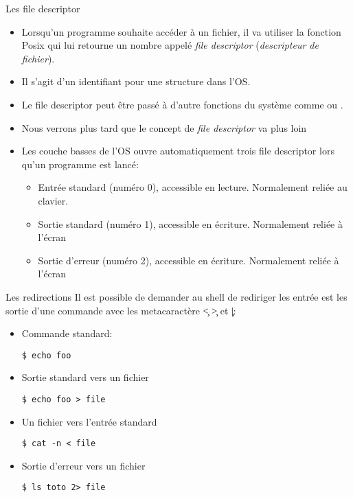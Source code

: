 \begin{frame}[fragile=singleslide]{Les file descriptor}
  \begin{itemize}
  \item  Lorsqu'un programme  souhaite  accéder à  un  fichier, il  va
    utiliser  la  fonction Posix    qui  lui retourne  un
    nombre   appelé  \emph{file  descriptor}   (\emph{descripteur  de
      fichier}).
  \item Il s'agit d'un identifiant pour une structure dans l'OS.
  \item  Le file  descriptor peut  être passé  à d'autre  fonctions du
    système comme  ou .
  \item  Nous   verrons  plus  tard  que  le   concept  de  \emph{file
      descriptor} va plus loin
  \item  Les couche basses  de l'OS  ouvre automatiquement  trois file
    descriptor lors qu'un programme est lancé:
    \begin{itemize}
    \item    Entrée    standard     (numéro    0),    accessible    en
      lecture. Normalement reliée au clavier.
    \item    Sortie    standard     (numéro    1),    accessible    en
      écriture. Normalement reliée à l'écran
    \item    Sortie    d'erreur     (numéro    2),    accessible    en
      écriture. Normalement reliée à l'écran
    \end{itemize}
  \end{itemize}
\end{frame}

\begin{frame}[fragile=singleslide]{Les redirections}
  Il est possible de demander au shell de rediriger les entrée est les
  sortie d'une commande avec les metacaractère \c{<} \c{>} et \c{|}:
  \begin{itemize}
  \item Commande standard:
    \begin{lstlisting}
$ echo foo
    \end{lstlisting}
  \item Sortie standard vers un fichier
    \begin{lstlisting}
$ echo foo > file
    \end{lstlisting}
  \item Un fichier vers l'entrée standard
    \begin{lstlisting}
$ cat -n < file
    \end{lstlisting} %
  \item Sortie d'erreur vers un fichier
    \begin{lstlisting}
$ ls toto 2> file
    \end{lstlisting} %
  \end{itemize}
\end{frame}

